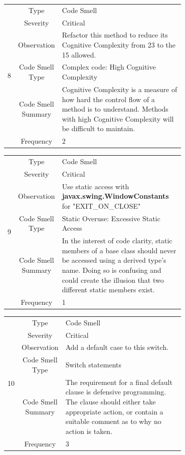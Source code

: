 \documentclass[12pt,letterpaper]{report}
\begin{document}
\begin{table}
    \begin{tabular}{|c|c|p{0.7\linewidth}|}
    \hline   
    \multirow{6}{*}{8}
        & Type & Code Smell \\
    \cline{2-3}
        & Severity & Critical \\
    \cline{2-3}
       & Observation & Refactor this method to reduce its Cognitive Complexity from 23 to the 15 allowed. \\
    \cline{2-3}
       & Code Smell Type & Complex code: High Cognitive Complexity  \\
    \cline{2-3}
       & Code Smell Summary & Cognitive Complexity is a measure of how hard the control flow of a method is to understand. Methods with high Cognitive Complexity will be difficult to maintain. \\
    \cline{2-3}
       & Frequency & 2 \\
    \hline
    \end{tabular}
\end{table}

\begin{table}
    \begin{tabular}{|c|c|p{0.7\linewidth}|}
    \hline   
    \multirow{6}{*}{9}
        & Type & Code Smell \\
    \cline{2-3}
        & Severity & Critical \\
    \cline{2-3}
       & Observation & Use static access with \textbf{javax.swing.WindowConstants} for "EXIT\_ON\_CLOSE" \\
    \cline{2-3}
       & Code Smell Type & Static Overuse: Excessive Static Access  \\
    \cline{2-3}
       & Code Smell Summary & In the interest of code clarity, static members of a base class should never be accessed using a derived type’s name. Doing so is confusing and could create the illusion that two different static members exist. \\
    \cline{2-3}
       & Frequency & 1 \\
    \hline
    \end{tabular}
\end{table}

\begin{table}
    \begin{tabular}{|c|c|p{0.7\linewidth}|}
    \hline   
    \multirow{6}{*}{10}
        & Type & Code Smell \\
    \cline{2-3}
        & Severity & Critical \\
    \cline{2-3}
       & Observation & Add a default case to this switch. \\
    \cline{2-3}
       & Code Smell Type & Switch statements   \\
    \cline{2-3}
       & Code Smell Summary & The requirement for a final default clause is defensive programming. The clause should either take appropriate action, or contain a suitable comment as to why no action is taken. \\
    \cline{2-3}
       & Frequency & 3 \\
    \hline
    \end{tabular}
\end{table}
\end{document}
